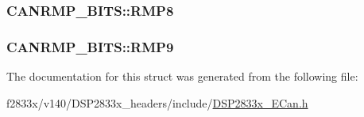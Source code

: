 \subsubsection[{R\+M\+P8}]{ C\+A\+N\+R\+M\+P\+\_\+\+B\+I\+T\+S\+::\+R\+M\+P8}\label{struct_c_a_n_r_m_p___b_i_t_s_a7d0a4739fe45f8af81cd13251778ace7}
\hypertarget{struct_c_a_n_r_m_p___b_i_t_s_aabcc69d8dfe0fc02eaeef9a951eff0bb}{}
\subsubsection[{R\+M\+P9}]{ C\+A\+N\+R\+M\+P\+\_\+\+B\+I\+T\+S\+::\+R\+M\+P9}\label{struct_c_a_n_r_m_p___b_i_t_s_aabcc69d8dfe0fc02eaeef9a951eff0bb}


The documentation for this struct was generated from the following file\+:\begin{DoxyCompactItemize}
\item 
f2833x/v140/\+D\+S\+P2833x\+\_\+headers/include/\hyperlink{_d_s_p2833x___e_can_8h}{D\+S\+P2833x\+\_\+\+E\+Can.\+h}\end{DoxyCompactItemize}
